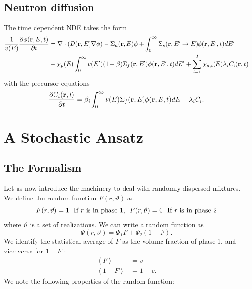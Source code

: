 \documentclass[12pt]{article}
\begin{document}
\subsection{Neutron diffusion}
The time dependent NDE takes the form 
\begin{align}
    \frac{1}{v(E)} \frac{\partial \phi (\bold{r},E,t)}{\partial t}&=\bold{\nabla} \cdot (D(\bold{r}, E)\bold{\nabla} \phi)-\Sigma_a (\bold{r},E)\phi+\int_{0}^{\infty}\Sigma_s(\bold{r}, E'\rightarrow E)\phi(\bold{r},E',t)dE' \notag \\ & +\chi_p(E) \int_0 ^{\infty} \nu(E') (1-\beta)\Sigma_f (\bold{r},E')\phi(\bold{r},E',t)dE' +\sum_{i=1}^{I} \chi_{d,i}(E)\lambda_i C_i(\bold{r},t) \label{TDNDE}
\end{align}
with the precursor equations 
\begin{equation}
    \frac{\partial C_i({\bold{r},t)}}{\partial t}=\beta_i \int_0^\infty \nu(E) \Sigma_f (\bold{r},E) \phi(\bold{r}, E,t)dE-\lambda_i C_i .
\end{equation}


\section{A Stochastic Ansatz}
\subsection{The Formalism}
Let us now introduce the machinery to deal with randomly dispersed mixtures. We define the random function $F(r,\vartheta)$ as 
\begin{equation}
    F(r,\vartheta)=1 \hspace{0.25cm}\text{If $r$ is in phase 1,} \hspace{0.25cm} F(r, \vartheta)=0 \hspace{0.25cm} \text{If $r$ is in phase 2}
\end{equation}
where $\vartheta$ is a set of realizations. We can write a random function as 
\begin{equation}
    \Psi(r, \vartheta)=\Psi_1 F+ \Psi_2 (1-F).
\end{equation}
We identify the statistical average of $F$ as the volume fraction of phase 1, and vice versa for $1-F$ :
\begin{align}
    \left< F \right>&=v \\
    \left< 1-F \right>& = 1-v.
\end{align}
We note the following properties of the random function: 
\end{document}

